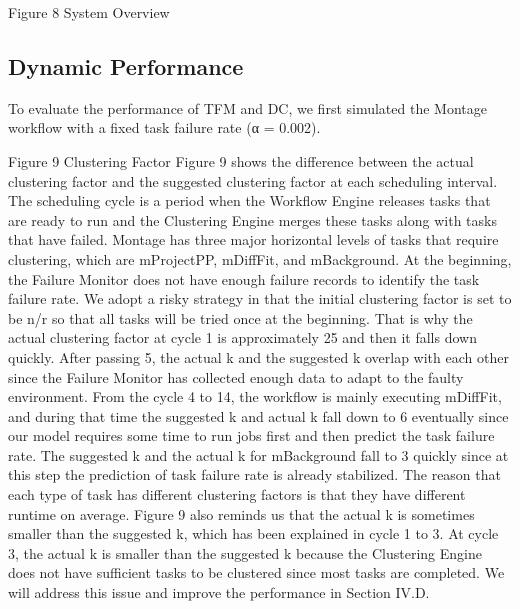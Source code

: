 \documentclass{IOS-Book-Article}
\begin{document}
Figure 8	 System Overview
\subsection{Dynamic Performance}
To evaluate the performance of TFM and DC, we first simulated the Montage workflow with a fixed task failure rate (α = 0.002).  
 
Figure 9	Clustering Factor
Figure 9 shows the difference between the actual clustering factor and the suggested clustering factor at each scheduling interval. The scheduling cycle is a period when the Workflow Engine releases tasks that are ready to run and the Clustering Engine merges these tasks along with tasks that have failed. Montage has three major horizontal levels of tasks that require clustering, which are mProjectPP, mDiffFit, and mBackground. At the beginning, the Failure Monitor does not have enough failure records to identify the task failure rate. We adopt a risky strategy in that the initial clustering factor is set to be n/r so that all tasks will be tried once at the beginning. That is why the actual clustering factor at cycle 1 is approximately 25 and then it falls down quickly. After passing 5, the actual k and the suggested k overlap with each other since the Failure Monitor has collected enough data to adapt to the faulty environment. From the cycle 4 to 14, the workflow is mainly executing mDiffFit, and during that time the suggested k and actual k fall down to 6 eventually since our model requires some time to run jobs first and then predict the task failure rate. The suggested k and the actual k for mBackground fall to 3 quickly since at this step the prediction of task failure rate is already stabilized. The reason that each type of task has different clustering factors is that they have different runtime on average. 
  Figure 9 also reminds us that the actual k is sometimes smaller than the suggested k, which has been explained in cycle 1 to 3. At cycle 3, the actual k is smaller than the suggested k because the Clustering Engine does not have sufficient tasks to be clustered since most tasks are completed. We will address this issue and improve the performance in Section IV.D. 
\end{document}
